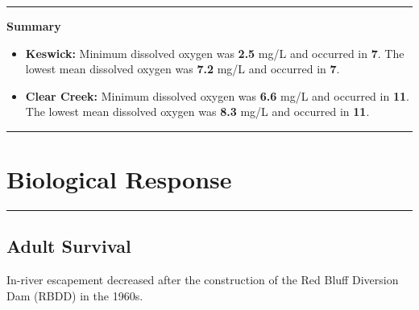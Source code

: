\documentclass[
]{book}
\providecommand{\tightlist}{%
  \setlength{\itemsep}{0pt}\setlength{\parskip}{0pt}}
\theoremstyle{definition}
\theoremstyle{definition}
\theoremstyle{definition}
\theoremstyle{definition}
\theoremstyle{remark}
\begin{document}
\begin{center}\rule{0.5\linewidth}{0.5pt}\end{center}

\textbf{Summary}

\begin{itemize}
\tightlist
\item
  \textbf{Keswick:} Minimum dissolved oxygen was \textbf{2.5} mg/L and occurred in \textbf{7}. The lowest mean dissolved oxygen was \textbf{7.2} mg/L and occurred in \textbf{7}.
\item
  \textbf{Clear Creek:} Minimum dissolved oxygen was \textbf{6.6} mg/L and occurred in \textbf{11}. The lowest mean dissolved oxygen was \textbf{8.3} mg/L and occurred in \textbf{11}.
\end{itemize}

\begin{center}\rule{0.5\linewidth}{0.5pt}\end{center}

\hypertarget{biological-response}{%
\section{Biological Response}\label{biological-response}}

\begin{center}\rule{0.5\linewidth}{0.5pt}\end{center}

\hypertarget{adult-survival}{%
\subsection{Adult Survival}\label{adult-survival}}

In-river escapement decreased after the construction of the Red Bluff Diversion Dam (RBDD) in the 1960s.
\end{document}
